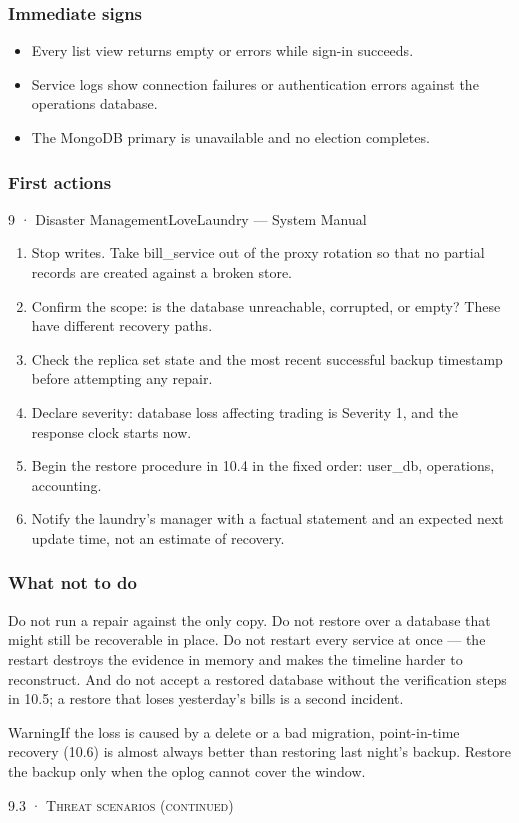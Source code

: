 \documentclass[11pt,a4paper,oneside]{book}
\begin{document}
\subsubsection*{Immediate signs}
\begin{itemize}
\item Every list view returns empty or errors while sign-in succeeds.
\item Service logs show connection failures or authentication errors against the operations database.
\item The MongoDB primary is unavailable and no election completes.
\end{itemize}
\subsubsection*{First actions}
9 · Disaster ManagementLoveLaundry — System Manual

\begin{enumerate}
\item Stop writes. Take bill\_service out of the proxy rotation so that no partial records are created against a broken store.
\item Confirm the scope: is the database unreachable, corrupted, or empty? These have different recovery paths.
\item Check the replica set state and the most recent successful backup timestamp before attempting any repair.
\item Declare severity: database loss affecting trading is Severity 1, and the response clock starts now.
\item Begin the restore procedure in 10.4 in the fixed order: user\_db, operations, accounting.
\item Notify the laundry's manager with a factual statement and an expected next update time, not an estimate of recovery.
\end{enumerate}
\subsubsection*{What not to do}
Do not run a repair against the only copy. Do not restore over a database that might still be recoverable in place. Do not restart every service at once — the restart destroys the evidence in memory and makes the timeline harder to reconstruct. And do not accept a restored database without the verification steps in 10.5; a restore that loses yesterday's bills is a second incident.

\begin{notebox}WarningIf the loss is caused by a delete or a bad migration, point-in-time recovery (10.6) is almost always better than restoring last night's backup. Restore the backup only when the oplog cannot cover the window.\end{notebox}
\textsc{\small\color{crimson}9.3 · Threat scenarios (continued)}\par\medskip
\end{document}
